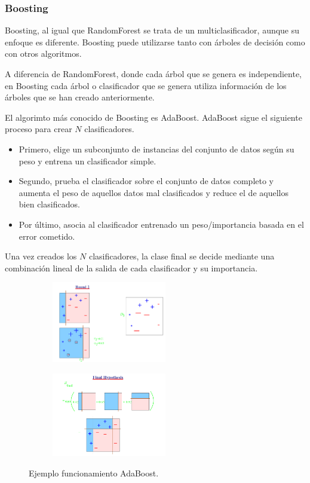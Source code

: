 \subsubsection{Boosting}
Boosting, al igual que RandomForest se trata de un multiclasificador, aunque su enfoque es diferente. Boosting puede utilizarse tanto con árboles de decisión como con otros algoritmos.\newline

A diferencia de RandomForest, donde cada árbol que se genera es independiente, en Boosting cada árbol o clasificador que se genera utiliza información de los árboles que se han creado anteriormente.\newline

El algorimto más conocido de Boosting es AdaBoost. AdaBoost sigue el siguiente proceso para crear $N$ clasificadores. 
\begin{itemize}
	\item Primero, elige un subconjunto de instancias del conjunto de datos según su peso y entrena un clasificador simple.\newpage
	\item Segundo, prueba el clasificador sobre el conjunto de datos completo y aumenta el peso de aquellos datos mal clasificados y reduce el de aquellos bien clasificados.
	\item Por último, asocia al clasificador entrenado un peso/importancia basada en el error cometido.
\end{itemize}
\verticalspace

Una vez creados los $N$ clasificadores, la clase final se decide mediante una combinación lineal de la salida de cada clasificador y su importancia.\newline

\begin{figure}[h]
	\centering
	\begin{subfigure}{.4\textwidth}
		\centering
		\includegraphics[width=50mm]{imagenes/boosting_2.png}
	\end{subfigure}
	\hspace{0.01in}
	\begin{subfigure}{.4\textwidth}
		\centering
		\includegraphics[width=50mm]{imagenes/boosting_final.png}
	\end{subfigure}
	\label{fig:217}
	\caption{Ejemplo funcionamiento AdaBoost.}
\end{figure}
\verticalspace


